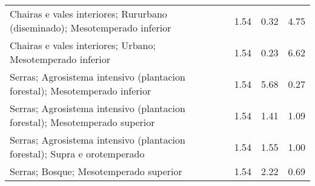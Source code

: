 \begin{table}[p]
\begin{tabular}{lrrr}
  Chairas e vales interiores; Rururbano (diseminado); Mesotemperado inferior & 1.54 & 0.32 & 4.75 \\ 
  Chairas e vales interiores; Urbano; Mesotemperado inferior & 1.54 & 0.23 & 6.62 \\ 
  Serras; Agrosistema intensivo (plantacion forestal); Mesotemperado inferior & 1.54 & 5.68 & 0.27 \\ 
  Serras; Agrosistema intensivo (plantacion forestal); Mesotemperado superior & 1.54 & 1.41 & 1.09 \\ 
  Serras; Agrosistema intensivo (plantacion forestal); Supra e orotemperado & 1.54 & 1.55 & 1.00 \\ 
  Serras; Bosque; Mesotemperado superior & 1.54 & 2.22 & 0.69 \\ 
   \hline
\end{tabular}
\end{table}
